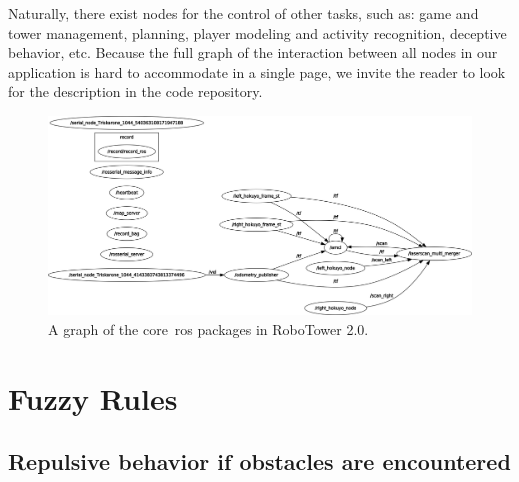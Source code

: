 Naturally, there exist nodes for the control of other tasks, such as: game and tower management, planning, player modeling and activity recognition, deceptive behavior, etc. Because the full graph of the interaction between all nodes in our application is hard to accommodate in a single page, we invite the reader to look for the description in the code repository.

\begin{figure}[H]
	\centering
	\includegraphics[width=12cm]{images/A-hardware/rosgraph_triskar}
	\caption{A graph of the core~\gls{ros} packages in RoboTower 2.0.} 
	\label{fig:ros_graph_robotower}
\end{figure}

\section{Fuzzy Rules} 
\subsection{Repulsive behavior if obstacles are encountered}

